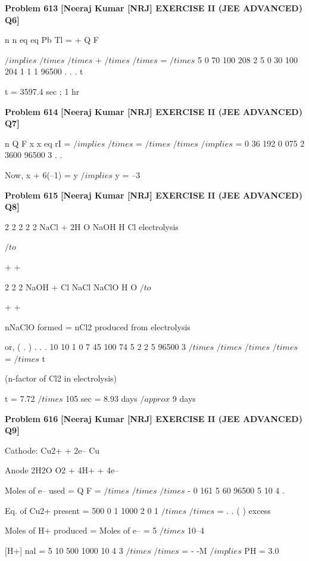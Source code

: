\begin{problembox}
\textbf{Problem 613} \hfill \textbf{[Neeraj Kumar [NRJ] EXERCISE II (JEE ADVANCED) Q6]}
\label{q:ext-nrj_all_questions-613}

n
n
eq
eq
Pb
Tl =
+
Q
F 
 
 
$/implies$
$/times$
$/times$
+
$/times$
$/times$ =
$/times$
5 0
70
100
208
2
5 0
30
100
204
1
1 1
96500
.
.
.
t 
 
   t = 3597.4 sec ; 1 hr
\end{problembox}

\begin{problembox}
\textbf{Problem 614} \hfill \textbf{[Neeraj Kumar [NRJ] EXERCISE II (JEE ADVANCED) Q7]}
\label{q:ext-nrj_all_questions-614}

n
Q
F
x
x
eq
rI =
$/implies$
$/times$
=
$/times$
$/times$
$/implies$
=
0 36
192
0 075
2
3600
96500
3
.
.
 
 
 Now, x + 6(--1) = y $/implies$ y = --3
\end{problembox}

\begin{problembox}
\textbf{Problem 615} \hfill \textbf{[Neeraj Kumar [NRJ] EXERCISE II (JEE ADVANCED) Q8]}
\label{q:ext-nrj_all_questions-615}

2
2
2
2
2
NaCl + 2H O
NaOH
H
Cl
electrolysis
 
$/to$
    
+
+
 
 
 
2
2
2
NaOH + Cl
NaCl
NaClO
H O
 $/to$
 
+
+
 
 
 nNaClO formed = nCl2 produced from electrolysis
 
 or, 
(
. )
.
.
.
10
10
1 0
7 45
100
74 5
2
2 5
96500
3
$/times$
$/times$
$/times$
$/times$
=
$/times$ t 
 
 (n-factor of Cl2 in electrolysis)
 
   t = 7.72 $/times$ 105 sec = 8.93 days $/approx$ 9 days
\end{problembox}

\begin{problembox}
\textbf{Problem 616} \hfill \textbf{[Neeraj Kumar [NRJ] EXERCISE II (JEE ADVANCED) Q9]}
\label{q:ext-nrj_all_questions-616}

Cathode: Cu2+ + 2e-- 
 Cu
 
 Anode 2H2O 
O2 + 4H+ + 4e--
 
 Moles of e-- used = Q
F =
$/times$
$/times$
$/times$
-
0 161 5
60
96500
5 10 4
.

 
 Eq. of Cu2+ present = 500
0 1
1000
2
0 1
$/times$
$/times$
=
.
. (
)
excess
 
   Moles of H+ produced = Moles of e-- = 5 $/times$ 10--4
 
   [H+]  nal = 5 10
500
1000
10
4
3
$/times$
$/times$
=
-
-M $/implies$ PH = 3.0
\end{problembox}

